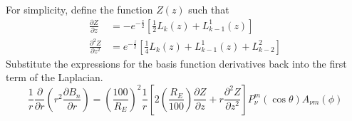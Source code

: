 \documentclass[12pt,letterpaper]{article}
\begin{document}
  For simplicity, define the function \(Z(z)\) such that
  \begin{align}
    \frac{\partial Z}{\partial z} &= -e^{-\frac{z}{2}}\left[\frac{1}{2}L_k(z)+L_{k-1}^1(z)\right] \\
    \frac{\partial^2 Z}{\partial z^2} &= e^{-\frac{z}{2}}\left[\frac{1}{4}L_k(z)+L_{k-1}^1(z)+L_{k-2}^2\right]
  \end{align}
  Substitute the expressions for the basis function derivatives back into the first term of the Laplacian.
  \begin{equation}
    \frac{1}{r}\frac{\partial}{\partial r}\left(r^2\frac{\partial B_n}{\partial r}\right) = \left(\frac{100}{R_E}\right)^2\frac{1}{r}\left[2\left(\frac{R_E}{100}\right)\frac{\partial Z}{\partial z} + r\frac{\partial^2 Z}{\partial z^2}\right]P_\nu^m(\cos\theta) A_{\nu m}(\phi)
  \end{equation}
\end{document}
